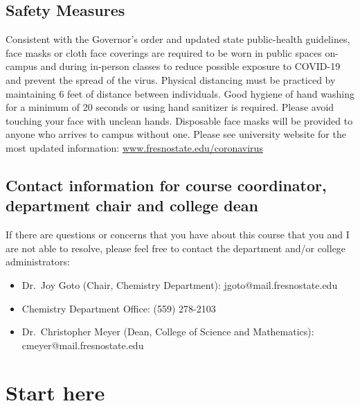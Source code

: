 \hypertarget{safety-measures}{%
\subsection{Safety Measures}\label{safety-measures}}

Consistent with the Governor's order and updated state public-health
guidelines, face masks or cloth face coverings are required to be worn
in public spaces on-campus and during in-person classes to reduce
possible exposure to COVID-19 and prevent the spread of the virus.
Physical distancing must be practiced by maintaining 6 feet of distance
between individuals. Good hygiene of hand washing for a minimum of 20
seconds or using hand sanitizer is required. Please avoid touching your
face with unclean hands. Disposable face masks will be provided to
anyone who arrives to campus without one. Please see university website
for the most updated information:
\href{http://www.fresnostate.edu/president/coronavirus/index.html}{www.fresnostate.edu/coronavirus}

\hypertarget{contact-information-for-course-coordinator-department-chair-and-college-dean}{%
\subsection{Contact information for course coordinator, department chair
and college
dean}\label{contact-information-for-course-coordinator-department-chair-and-college-dean}}

If there are questions or concerns that you have about this course that
you and I are not able to resolve, please feel free to contact the
department and/or college administrators:

\begin{itemize}
\tightlist
\item
  Dr.~Joy Goto (Chair, Chemistry Department): jgoto@mail.fresnostate.edu
\item
  Chemistry Department Office: (559) 278-2103
\item
  Dr.~Christopher Meyer (Dean, College of Science and Mathematics):
  cmeyer@mail.fresnostate.edu
\end{itemize}

\newpage

\hypertarget{start-here}{%
\section{Start here}\label{start-here}}


